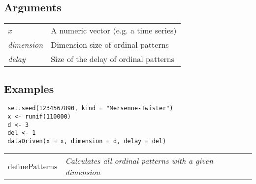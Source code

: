 \documentclass[12pt,letterpaper]{article}
\begin{document}
\subsection*{Arguments}

\begin{table}[!ht]
\begin{center}
\begin{tabularx}{\textwidth}{X X}
\hspace{0.5cm} \textit{x} & A numeric vector (e.g. a time series)\\
\hspace{0.5cm} \textit{dimension} & Dimension size of ordinal patterns\\
\hspace{0.5cm} \textit{delay} & Size of the delay of ordinal patterns\\
\end{tabularx}
\end{center}
\end{table} 

\subsection*{Examples}

\begin{lstlisting}
 set.seed(1234567890, kind = "Mersenne-Twister")
 x <- runif(110000)
 d <- 3
 del <- 1
 dataDriven(x = x, dimension = d, delay = del)
\end{lstlisting}

\vspace{0.5cm}


\hrulefill   

\begin{table}[!ht]
\begin{center}
\begin{tabularx}{\textwidth}{ X X}
\hspace{0.5cm} definePatterns & \textit{Calculates all ordinal patterns with a given dimension}\\
\end{tabularx}
\end{center}
\end{table} 

\vspace{-0.5cm}

\hrulefill  
\end{document}
